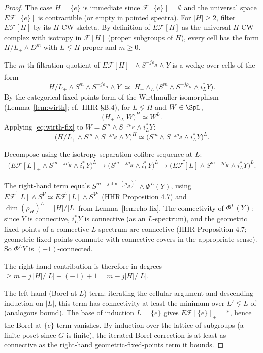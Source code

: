 \documentclass[12pt]{article}
\theoremstyle{definition}
\newcommand{\fix}[1]{\widetilde{E\mathcal{F}[#1]}}
\newcommand{\Esub}[1]{E\mathcal{F}[#1]}
\begin{document}
\begin{proof}
The case $H=\{e\}$ is immediate since $\mathcal{F}[\{e\}]=\emptyset$ and the
universal space $\Esub{\{e\}}$ is contractible (or empty in pointed
spectra). For $|H|\geq 2$, filter $\Esub{H}$ by its $H$-CW skeleta. By
definition of $\Esub{H}$ as the universal $H$-CW complex with isotropy in
$\mathcal{F}[H]$ (proper subgroups of $H$), every cell has the form
$H/L_{+}\wedge D^{m}$ with $L\lneq H$ proper and $m\geq 0$.

The $m$-th filtration quotient of $\Esub{H}_{+}\wedge S^{-j\rho_{H}}\wedge Y$
is a wedge over cells of the form
\[
H/L_{+}\wedge S^{m}\wedge S^{-j\rho_{H}}\wedge Y
\;\simeq\;H_{+}\wedge_{L}\bigl(S^{m}\wedge S^{-j\rho_{H}}\wedge i_{L}^{\ast}Y\bigr).
\]
By the categorical-fixed-points form of the Wirthmüller isomorphism
(Lemma~\ref{lem:wirth}; cf.\ HHR §B.4), for $L\lneq H$ and $W\in\SpL$,
\begin{equation}
\bigl(H_{+}\wedge_{L}W\bigr)^{H}\simeq W^{L}.
\label{eq:wirth-fix}
\end{equation}
Applying \eqref{eq:wirth-fix} to $W=S^{m}\wedge S^{-j\rho_{H}}\wedge i_{L}^{\ast}Y$:
\[
\bigl(H/L_{+}\wedge S^{m}\wedge S^{-j\rho_{H}}\wedge Y\bigr)^{H}
\simeq\bigl(S^{m}\wedge S^{-j\rho_{H}}\wedge i_{L}^{\ast}Y\bigr)^{L}.
\]

Decompose using the isotropy-separation cofibre sequence at $L$:
\[
\bigl(\Esub{L}_{+}\wedge S^{m-j\rho_{H}}\wedge i_{L}^{\ast}Y\bigr)^{L}
\to\bigl(S^{m-j\rho_{H}}\wedge i_{L}^{\ast}Y\bigr)^{L}
\to\bigl(\fix{L}\wedge S^{m-j\rho_{H}}\wedge i_{L}^{\ast}Y\bigr)^{L}.
\]

The right-hand term equals
$S^{m-j\dim(\rho_{H})^{L}}\wedge\Phi^{L}(Y)$, using
$\fix{L}\wedge S^{V}\simeq\fix{L}\wedge S^{V^{L}}$ (HHR Proposition 4.7) and
$\dim(\rho_{H})^{L}=|H|/|L|$ from Lemma~\ref{lem:rho-fix}. The connectivity of
$\Phi^{L}(Y)$: since $Y$ is connective, $i_{L}^{\ast}Y$ is connective (as an
$L$-spectrum), and the geometric fixed points of a connective $L$-spectrum
are connective (HHR Proposition 4.7; geometric fixed points commute with
connective covers in the appropriate sense). So $\Phi^{L}Y$ is
$(-1)$-connected.

The right-hand contribution is therefore in degrees
$\geq m-j\,|H|/|L|+(-1)+1=m-j|H|/|L|$.

The left-hand (Borel-at-$L$) term: iterating the cellular argument and
descending induction on $|L|$, this term has connectivity at least the
minimum over $L'\lneq L$ of (analogous bound). The base of induction
$L=\{e\}$ gives $\Esub{\{e\}}_{+}=\ast$, hence the Borel-at-$\{e\}$ term
vanishes. By induction over the lattice of subgroups (a finite poset since
$G$ is finite), the iterated Borel correction is at least as connective as
the right-hand geometric-fixed-points term it bounds.


\end{proof}
\end{document}
